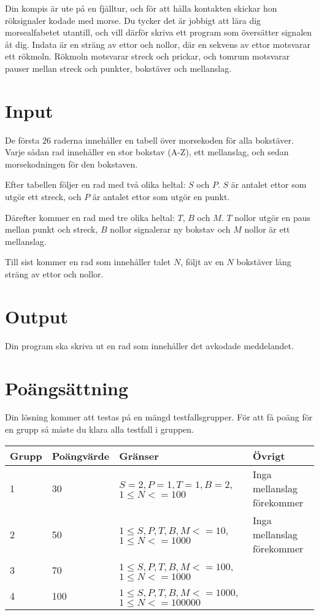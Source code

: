 
Din kompis är ute på en fjälltur, och för att hålla kontakten skickar hon röksignaler kodade med morse. Du tycker det är jobbigt att lära dig morsealfabetet utantill, och vill därför skriva ett program som översätter signalen åt dig. Indata är en sträng av ettor och nollor, där en sekvens av ettor motsvarar ett rökmoln. Rökmoln motsvarar streck och prickar, och tomrum motsvarar pauser mellan streck och punkter, bokstäver och mellanslag.

\section*{Input}
De första $26$ raderna innehåller en tabell över morsekoden för alla bokstäver.
Varje sådan rad innehåller en stor bokstav (A-Z), ett mellanslag, och sedan morsekodningen för den bokstaven.

Efter tabellen följer en rad med två olika heltal: $S$ och $P$.
$S$ är antalet ettor som utgör ett streck, och $P$ är antalet ettor som utgör en punkt.

Därefter kommer en rad med tre olika heltal: $T$, $B$ och $M$.
$T$ nollor utgör en paus mellan punkt och streck, $B$ nollor signalerar ny bokstav och $M$ nollor är ett mellanslag.

Till sist kommer en rad som innehåller talet $N$, följt av en $N$ bokstäver lång sträng av ettor och nollor.

\section*{Output}
Din program ska skriva ut en rad som innehåller det avkodade meddelandet.

\section*{Poängsättning}
Din lösning kommer att testas på en mängd testfallsgrupper. För att få poäng för en grupp
så måste du klara alla testfall i gruppen.
\begin{tabular}{| l | l | l | l |}
\hline
Grupp & Poängvärde & Gränser & Övrigt \\ \hline
1     & 30         &  $S = 2, P = 1, T = 1, B = 2$, $1 \le N <= 100$  & Inga mellanslag förekommer\\ \hline
2     & 50         &  $1 \le S, P, T, B, M <= 10$, $1 \le N <= 1000$ & Inga mellanslag förekommer \\ \hline
3     & 70         &  $1 \le S, P, T, B, M <= 100$, $1 \le N <= 1000$    & \\ \hline
4     & 100        &  $1 \le S, P, T, B, M <= 1000$, $1 \le N <= 100000$  & \\ \hline
\end{tabular}
